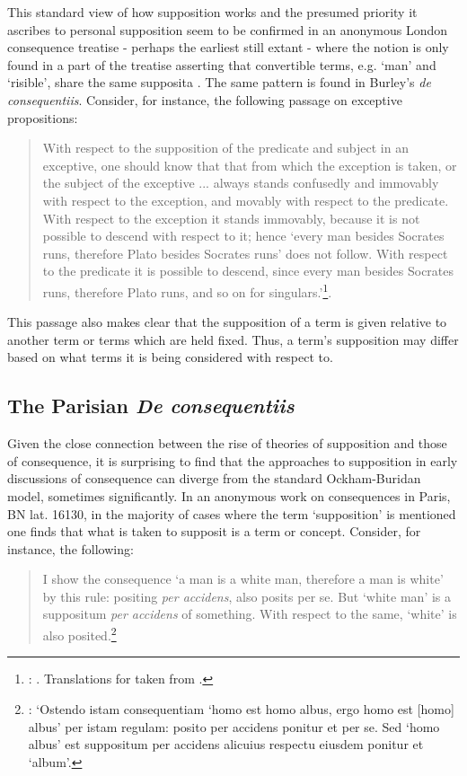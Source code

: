 \documentclass[a4paper, 11pt]{article}
\begin{document}
This standard view of how supposition works and the presumed priority it ascribes to personal supposition seem to be confirmed in an anonymous London consequence treatise - perhaps the earliest still extant - where the notion is only found in a part of the treatise asserting that convertible terms, e.g. `man' and `risible', share the same supposita \autocite[9, par. 27]{Green-Pedersen1980a}. The same pattern is found in Burley's \emph{de consequentiis}. Consider, for instance, the following passage on exceptive propositions:
\begin{quote}
With respect to the supposition of the predicate and subject in an exceptive, one should know that that from which the exception is taken, or the subject of the exceptive ... always stands confusedly and immovably with respect to the exception, and movably with respect to the predicate. With respect to the exception it stands immovably, because it is not possible to descend with respect to it; hence `every man besides Socrates runs, therefore Plato besides Socrates runs' does not follow. With respect to the predicate it is possible to descend, since every man besides Socrates runs, therefore Plato runs, and so on for singulars.'\footnote{\autocite[124, par. 58]{Green-Pedersen1980b}: . Translations for \autocite{Green-Pedersen1980a,Green-Pedersen1980b} taken from \autocite[171-273]{Archambault2017d}.}.
\end{quote}
This passage also makes clear that the supposition of a term is given relative to another term or terms which are held fixed. Thus, a term's supposition may differ based on what terms it is being considered with respect to.

\subsection{The Parisian \emph{De consequentiis}}
Given the close connection between the rise of theories of supposition and those of consequence, it is surprising to find that the approaches to supposition in early discussions of consequence can diverge from the standard Ockham-Buridan model, sometimes significantly. In an anonymous work on consequences in Paris, BN lat. 16130, in the majority of cases where the term `supposition' is mentioned one finds that what is taken to supposit is a term or concept. Consider, for instance, the following:

\begin{quote}
I show the consequence `a man is a white man, therefore a man is white' by this rule: positing \emph{per accidens}, also posits per se. But `white man' is a suppositum \emph{per accidens} of something. With respect to the same, `white' is also posited.\footnote{\autocite[18, par. 34]{Green-Pedersen1980a}: `Ostendo istam consequentiam `homo est homo albus, ergo homo est [homo] albus' per istam regulam: posito per accidens ponitur et per se. Sed `homo albus' est suppositum per accidens alicuius respectu eiusdem ponitur et `album'.}
\end{quote}
\end{document}
